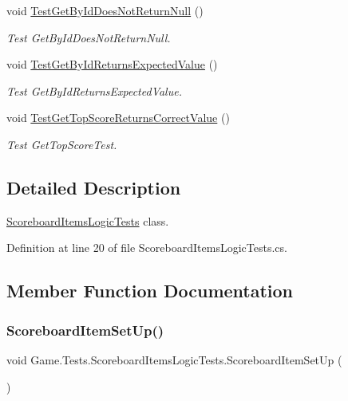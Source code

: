 \begin{DoxyCompactItemize}
void \mbox{\hyperlink{class_game_1_1_tests_1_1_scoreboard_items_logic_tests_a52a7c5a32beeb551fbbe8ad20a9cb8db}{Test\+Get\+By\+Id\+Does\+Not\+Return\+Null}} ()
\begin{DoxyCompactList}\small\item\em Test Get\+By\+Id\+Does\+Not\+Return\+Null. \end{DoxyCompactList}\item 
void \mbox{\hyperlink{class_game_1_1_tests_1_1_scoreboard_items_logic_tests_ad516ef0d1b1ed53bbf86e449584ac5d3}{Test\+Get\+By\+Id\+Returns\+Expected\+Value}} ()
\begin{DoxyCompactList}\small\item\em Test Get\+By\+Id\+Returns\+Expected\+Value. \end{DoxyCompactList}\item 
void \mbox{\hyperlink{class_game_1_1_tests_1_1_scoreboard_items_logic_tests_a306dbcb84a094d2579c3e094a1958cbc}{Test\+Get\+Top\+Score\+Returns\+Correct\+Value}} ()
\begin{DoxyCompactList}\small\item\em Test Get\+Top\+Score\+Test. \end{DoxyCompactList}\end{DoxyCompactItemize}


\subsection{Detailed Description}
\mbox{\hyperlink{class_game_1_1_tests_1_1_scoreboard_items_logic_tests}{Scoreboard\+Items\+Logic\+Tests}} class. 



Definition at line 20 of file Scoreboard\+Items\+Logic\+Tests.\+cs.



\subsection{Member Function Documentation}
\mbox{\label{class_game_1_1_tests_1_1_scoreboard_items_logic_tests_ab9a95cb43d0104d47981bfa849437118}} 
\subsubsection{\texorpdfstring{ScoreboardItemSetUp()}{ScoreboardItemSetUp()}}
{\footnotesize\ttfamily void Game.\+Tests.\+Scoreboard\+Items\+Logic\+Tests.\+Scoreboard\+Item\+Set\+Up (\begin{DoxyParamCaption}{ }\end{DoxyParamCaption})}



